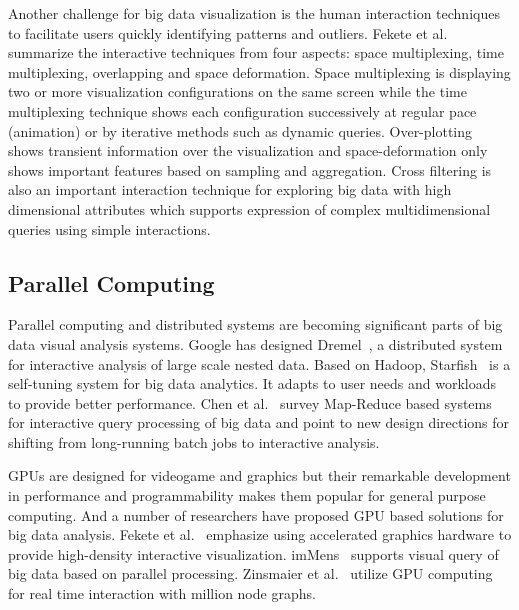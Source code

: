 \documentclass[journal]{vgtc}                %
\begin{document}
{Another challenge for big data visualization is the human interaction techniques to facilitate users quickly identifying patterns and outliers. Fekete et al.~\cite{Fekete:2002} summarize the interactive techniques from four aspects: space multiplexing, time multiplexing, overlapping and space deformation. Space multiplexing is displaying two or more visualization configurations on the same screen while the time multiplexing technique shows each configuration successively at regular pace (animation) or by iterative methods such as dynamic queries. Over-plotting shows transient information over the visualization and space-deformation only shows important features based on sampling and aggregation. Cross filtering \cite{weaver2010cross} is also an important interaction technique for exploring big data with high dimensional attributes which supports expression of complex multidimensional queries using simple interactions. 



\subsection{Parallel Computing}
Parallel computing and distributed systems are becoming significant parts of big data visual analysis systems.  Google has designed Dremel~\cite{melnik2010dremel}, a distributed system for interactive analysis of large scale nested data. Based on Hadoop, Starfish~\cite{herodotou} is a self-tuning system for big data analytics. It adapts to user needs and workloads to provide better performance. Chen et al.~\cite{Chen:2012} survey  Map-Reduce based systems for interactive query processing of big data and point to new design directions for shifting from long-running batch jobs to interactive analysis.

GPUs are designed for videogame and graphics but their remarkable development in performance and programmability makes them popular for general purpose computing.  And a number of researchers have proposed GPU based solutions for big data analysis. Fekete et al.~\cite{Fekete:2002} emphasize using accelerated graphics hardware to provide high-density interactive visualization. imMens~\cite{2013-immens} supports visual query of big data based on parallel  processing. Zinsmaier et al.~\cite{zinsmaier} utilize GPU computing for real time interaction with million node graphs.

}
\end{document}
